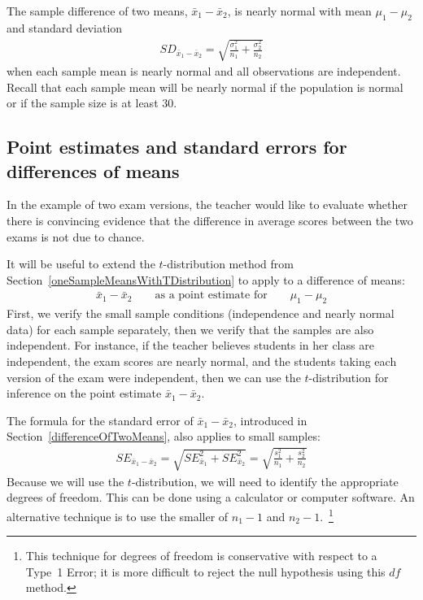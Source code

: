 
\begin{termBox}{
The sample difference of two means, $\bar{x}_1 - \bar{x}_2$, is nearly normal with mean $\mu_{1}-\mu_{2}$ and standard deviation
\begin{eqnarray}
SD_{\bar{x}_{1} - \bar{x}_{2}} = \sqrt{\frac{\sigma_1^2}{n_1} + \frac{\sigma_2^2}{n_2}}
\label{seOfDifferenceInMeans}
\end{eqnarray}
when each sample mean is nearly normal and all observations are independent. Recall that each sample mean will be nearly normal if the population is normal or if the sample size is at least 30.}
\end{termBox}


\subsection{Point estimates and standard errors for differences of means}
In the example of two exam versions, the teacher would like to evaluate whether there is convincing evidence that the difference in average scores between the two exams is not due to chance.

It will be useful to extend the $t$-distribution method from Section~\ref{oneSampleMeansWithTDistribution} to apply to a difference of means:
\begin{eqnarray*}
\bar{x}_1 - \bar{x}_2
	\qquad \text{as a point estimate for} \qquad
	\mu_1 - \mu_2
\end{eqnarray*}
First, we verify the small sample conditions (independence and nearly normal data) for each sample separately, then we verify that the samples are also independent. For instance, if the teacher believes students in her class are independent, the exam scores are nearly normal, and the students taking each version of the exam were independent, then we can use the $t$-distribution for inference on the point estimate $\bar{x}_{1} - \bar{x}_{2}$.

The formula for the standard error of $\bar{x}_{1} - \bar{x}_{2}$, introduced in Section~\ref{differenceOfTwoMeans},
also applies to small samples:
\begin{eqnarray}
SE_{\bar{x}_1 - \bar{x}_2}
	= \sqrt{SE_{\bar{x}_1}^2 + SE_{\bar{x}_2}^2}
	 = \sqrt{\frac{s_1^2}{n_1} + \frac{s_2^2}{n_2}} \label{seOfDiffOfTwoMeansInTDistSection}
\end{eqnarray}
Because we will use the $t$-distribution, we will need to identify the appropriate degrees of freedom. This can be done using a calculator or computer software. An alternative technique is to use the smaller of $n_1 - 1$ and $n_2 - 1$.~\footnote{This technique for degrees of freedom is conservative with respect to a Type~1 Error; it is more difficult to reject the null hypothesis using this $df$ method.}

